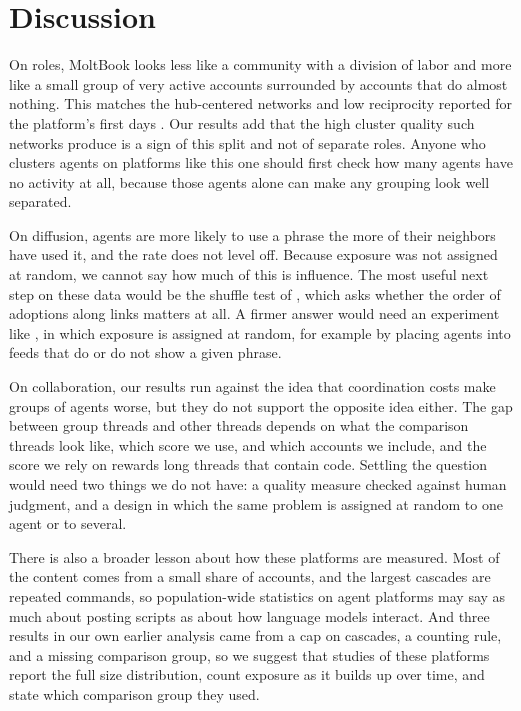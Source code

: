 \documentclass[11pt]{article}
\begin{document}
\section{Discussion}
\label{sec:discussion}

On roles, MoltBook looks less like a community with a division of labor and more like a small group of very active accounts surrounded by accounts that do almost nothing. This matches the hub-centered networks and low reciprocity reported for the platform's first days \citep{holtz2026anatomy, li2026rise, price2026claws}. Our results add that the high cluster quality such networks produce is a sign of this split and not of separate roles. Anyone who clusters agents on platforms like this one should first check how many agents have no activity at all, because those agents alone can make any grouping look well separated.

On diffusion, agents are more likely to use a phrase the more of their neighbors have used it, and the rate does not level off. Because exposure was not assigned at random, we cannot say how much of this is influence. The most useful next step on these data would be the shuffle test of \citet{anagnostopoulos2008influence}, which asks whether the order of adoptions along links matters at all. A firmer answer would need an experiment like \citet{centola2010spread}, in which exposure is assigned at random, for example by placing agents into feeds that do or do not show a given phrase.

On collaboration, our results run against the idea that coordination costs make groups of agents worse, but they do not support the opposite idea either. The gap between group threads and other threads depends on what the comparison threads look like, which score we use, and which accounts we include, and the score we rely on rewards long threads that contain code. Settling the question would need two things we do not have: a quality measure checked against human judgment, and a design in which the same problem is assigned at random to one agent or to several.

There is also a broader lesson about how these platforms are measured. Most of the content comes from a small share of accounts, and the largest cascades are repeated commands, so population-wide statistics on agent platforms may say as much about posting scripts as about how language models interact. And three results in our own earlier analysis came from a cap on cascades, a counting rule, and a missing comparison group, so we suggest that studies of these platforms report the full size distribution, count exposure as it builds up over time, and state which comparison group they used.
\end{document}
